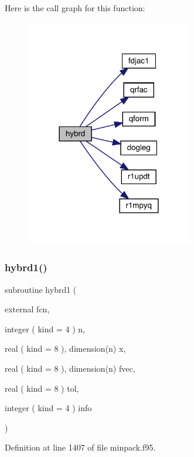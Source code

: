 Here is the call graph for this function\+:\nopagebreak
\begin{figure}[H]
\begin{center}
\leavevmode
\includegraphics[width=206pt]{minpack_8f95_a1e525d0d69e43bfda5f82e3bc4745b2f_cgraph}
\end{center}
\end{figure}
\mbox{\label{minpack_8f95_a314aebdd90b16a874c0879d291a2190d}} 
\subsubsection{\texorpdfstring{hybrd1()}{hybrd1()}}
{\footnotesize\ttfamily subroutine hybrd1 (\begin{DoxyParamCaption}\item[{external}]{fcn,  }\item[{integer ( kind = 4 )}]{n,  }\item[{real ( kind = 8 ), dimension(n)}]{x,  }\item[{real ( kind = 8 ), dimension(n)}]{fvec,  }\item[{real ( kind = 8 )}]{tol,  }\item[{integer ( kind = 4 )}]{info }\end{DoxyParamCaption})}



Definition at line 1407 of file minpack.\+f95.

